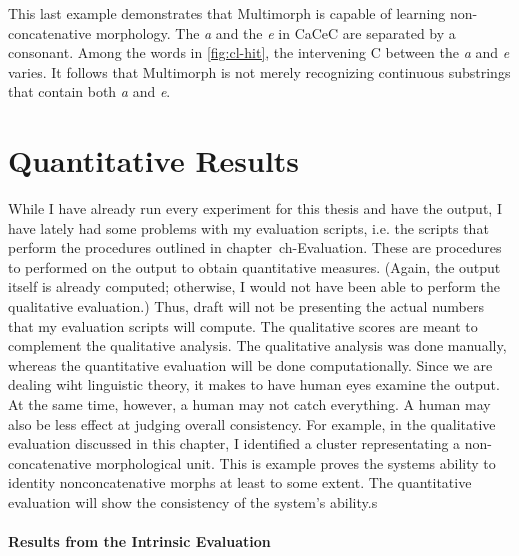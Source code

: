This last example demonstrates that Multimorph is capable of learning non-concatenative morphology. The \textit{a} and the \textit{e} in CaCeC are separated by a consonant. Among the words in \ref{fig:cl-hit}, the intervening C between the \textit{a} and \textit{e} varies. It follows that Multimorph is not merely recognizing continuous substrings that contain both \textit{a} and \textit{e}.

\section{Quantitative Results}

While I have already run every experiment for this thesis and have the output, I have lately had some problems with my evaluation scripts, i.e. the scripts that perform the procedures outlined in chapter~{ch-Evaluation}. These are procedures to performed on the output to obtain quantitative measures. (Again, the output itself is already computed; otherwise, I would not have been able to perform the qualitative evaluation.) 
Thus, draft will not be presenting the actual numbers that my evaluation scripts will compute. The qualitative scores are meant to complement the qualitative analysis. The qualitative analysis was done manually, whereas the quantitative evaluation will be done computationally. Since we are dealing wiht linguistic theory, it makes to have human eyes examine the output. At the same time, however, a human may not catch everything. A human may also be less effect at judging overall consistency. For example, in the qualitative evaluation discussed in this chapter, I identified a cluster representating a non-concatenative morphological unit. This is example proves the systems ability to identity nonconcatenative morphs at least to some extent. The quantitative evaluation will show the consistency of the system's ability.s
\paragraph{Results from the Intrinsic Evaluation}

